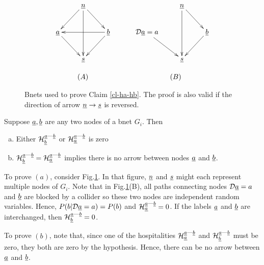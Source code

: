 \documentclass[12pt]{article}
\newcommand{\linkab }[0]{{\rva\text{---}\rvb}}
\begin{document}
\begin{figure}[h!]
$$
\begin{array}{ccc}
\xymatrix{
&\rvn\ar[ld]\ar[rd]\ar[dd]
\\
\rva\ar[rd]
&&\rvb\ar[ll]
\ar[ld]
\\
&
\rvs
}
&\quad&
\xymatrix{
&\rvn\ar[rd]\ar[dd]
\\
\cald\rva = a\ar[rd]
&&\rvb
\ar[ld]
\\
&
\rvs
}
\\
\\
(A)&&\quad(B)
\end{array}
$$
\caption{Bnets used 
to prove Claim \ref{cl-ha-hb}.
The proof is also valid if the
direction of
arrow ${\underline{n}}\rightarrow{\underline{s}}$
is reversed. }
\label{fig-ha-hb}
\end{figure} 


\begin{claim}\label{cl-ha-hb}
Suppose ${\underline{a}}, {\underline{b}}$ 
are any two nodes of
a bnet $G_i$. Then
\begin{enumerate}[(a)]
\item
Either 
$\calh_\rvb^\linkab$ or  $\calh_\rva^\linkab$
is zero

\item
$\calh_\rvb^\linkab= \calh_\rva^\linkab$ implies
there is no arrow between nodes
${\underline{a}}$ and ${\underline{b}}$.


\end{enumerate}
\end{claim}
\proof

To prove $(a)$,
consider Fig.\ref{fig-ha-hb}.
In that figure, ${\underline{n}}$ and ${\underline{s}}$
might each represent multiple nodes
of $G_i$.
Note that in 
Fig.\ref{fig-ha-hb}(B),
all paths connecting nodes ${\cal D} {\underline{a}}=a$ and 
${\underline{b}}$ are blocked by a collider
so these two nodes are independent
random variables.
Hence, $P(b|{\cal D} {\underline{a}}=a)= P(b)$
and $\calh_\rva^\linkab=0$.
If the labels ${\underline{a}}$ and ${\underline{b}}$ are 
interchanged, then 
$\calh_\rvb^\linkab=0$.

To prove $(b)$, 
note that, since one of 
the hospitalities 
$\calh_\rva^\linkab$
and 
$\calh_\rvb^\linkab$
must be zero, they both are zero by the hypothesis.
Hence, there can be no arrow
between ${\underline{a}}$ and ${\underline{b}}$.
\end{document}
